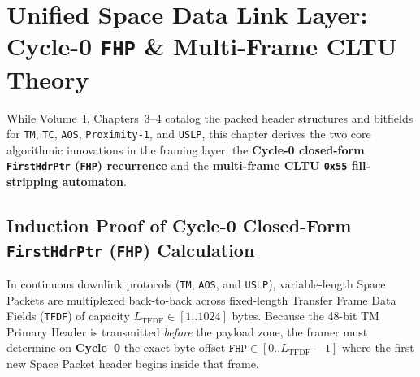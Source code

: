 \documentclass[10pt,a4paper]{article}
\renewcommand{\_}{\origunderscore\penalty0\hskip0pt\relax}
\numberwithin{equation}{section}
\numberwithin{table}{section}
\numberwithin{figure}{section}
\begin{document}
\section{Unified Space Data Link Layer: Cycle-0 \texttt{FHP} \& Multi-Frame CLTU Theory}

While Volume~I, Chapters~3--4 catalog the packed header structures and bitfields for \texttt{TM}, \texttt{TC}, \texttt{AOS}, \texttt{Proximity-1}, and \texttt{USLP}, this chapter derives the two core algorithmic innovations in the framing layer: the \textbf{Cycle-0 closed-form \texttt{First\_Hdr\_Ptr} (\texttt{FHP}) recurrence} and the \textbf{multi-frame CLTU \texttt{0x55} fill-stripping automaton}.

\subsection{Induction Proof of Cycle-0 Closed-Form \texttt{First\_Hdr\_Ptr} (\texttt{FHP}) Calculation}
In continuous downlink protocols (\texttt{TM}, \texttt{AOS}, and \texttt{USLP}), variable-length Space Packets are multiplexed back-to-back across fixed-length Transfer Frame Data Fields (\texttt{TFDF}) of capacity $L_{\text{TFDF}} \in [1..1024]$ bytes. Because the 48-bit TM Primary Header is transmitted \emph{before} the payload zone, the framer must determine on \textbf{Cycle~0} the exact byte offset $\texttt{FHP} \in [0..L_{\text{TFDF}}-1]$ where the first new Space Packet header begins inside that frame.
\end{document}

